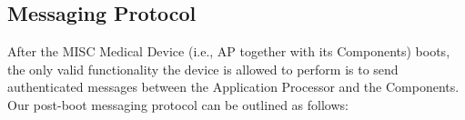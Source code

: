 \subsection{Messaging Protocol}
\label{sec:messaging}

After the MISC Medical Device (i.e., AP together with its Components) boots, the only valid functionality the device is allowed to perform is to send authenticated messages between the Application Processor and the Components. Our post-boot messaging protocol can be outlined as follows:

\newpage
\begin{pcimage}
\pcb{$\msg_{AP}(m, \cid)$}{
\> \> \\
\textbf{Application Processor} \> \text{(I2C channel)} \hspace{1.2cm} \> \textbf{Component i}
\\[0.1\baselineskip][\hline] \\[-0.5\baselineskip]
\> \sendmessageright*{\texttt{MSG\_INIT}} \> \\%
\> \> \nonce \sample \mathsf{CSPRNG}() \\
\> \sendmessageleft*{\nonce} \> \\
\sigma \gets \Sign_{\msk_{AP}} (\ell \| \cid \| \nonce' \| m) \> \> \\
\> \sendmessageright*{(\ell, \cid, \nonce', m), \sigma} \> \\
\> \> \text{Verify } \Ver_{\mvk_{AP}}(\ell \| \cid \| \nonce' \| m, \sigma) = 1 \\
\> \> \qquad \text{ and } \mathsf{len}(m) \leq \min{(\ell, 32 \text{B})} \\
\> \> \qquad \text{ and } \nonce' = \nonce \\
\> \> \qquad \text{ and } \cid = \cid_i \\
\> \sendmessageleft*{\texttt{MSG\_DONE}} \> \\
}
\vspace{-2em}
\end{pcimage}

